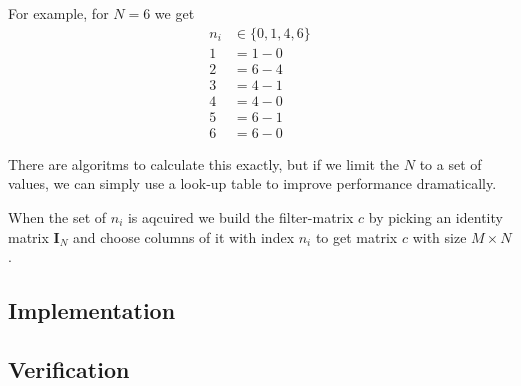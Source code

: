 \documentclass[report, oneside, a4paper, openany]{memoir}
\begin{document}
For example, for $N=6$ we get
\begin{equation*}
\begin{split}
n_i&\in\{0,1,4,6\}\\
1 &= 1-0\\
2 &= 6-4\\
3 &= 4-1\\
4 &= 4-0\\
5 &= 6-1\\
6 &= 6-0
\end{split}
\end{equation*}


There are algoritms to calculate this exactly, but if we limit the $N$ to a set of values, we can simply use a look-up table to improve performance dramatically.

When the set of $n_i$ is aqcuired we build the filter-matrix $c$ by picking an identity matrix $\mathbf{I}_N$ and choose columns of it with index $n_i$ to get matrix $c$ with size $M \times N$.

\subsection{Implementation}

\subsection{Verification}
\end{document}
